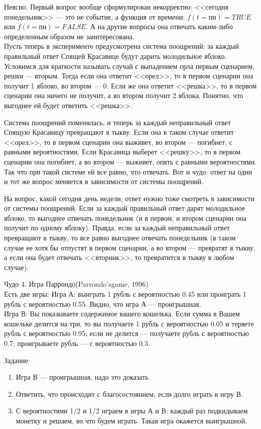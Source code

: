 Неясно. Первый вопрос вообще сформулирован некорректно: <<сегодня понедельник>> --- это не событие, а функция от времени: $f(t=пн)=TRUE$ или $f(t=пн)=FALSE$.
А на другие вопросы она отвечать каким-либо определенным образом не заинтересована. \\

Пусть теперь в эксперименте предусмотрена система поощрений: за каждый правильный ответ Спящей Красавице будут дарить молодильное яблоко. 
Условимся для краткости называть случай с выпадением орла первым сценарием, решки --- вторым.
Тогда если она ответит <<орел>>, то в первом сценарии она получит 1 яблоко, во втором --- 0.
Если же она ответит <<решка>>, то в первом сценарии она ничего не получит, а во втором получит 2 яблока.
Понятно, что выгоднее ей будет ответить <<решка>>.

Система поощрений поменялась, и теперь за каждый неправильный ответ Спящую Красавицу превращают в тыкву.
Если она в таком случае ответит <<орел>>, то в первом сценарии она выживет, во втором --- погибнет, с равными вероятностями. Если Красавица выберет <<решку>>, то в первом сценарии она  погибнет, а во втором --- выживет, опять с равными вероятностями. Так что при такой системе ей все равно, что отвечать.
Вот и чудо: ответ на один и тот же вопрос меняется в зависимости от системы поощрений.

На вопрос, какой сегодня день недели, ответ нужно тоже смотреть в зависимости от системы поощрений. Если за каждый правильный ответ дарят молодильное яблоко, то выгоднее отвечать понедельник (и в первом, и втором сценарии она получит по одному яблоку). Правда, если за каждый неправильный ответ превращают в тыкву, то все равно выгоднее отвечать понедельник (в таком случае ее хотя бы отпустят в первом сценарии, а во втором --- превратят в тыкву, а если она будет отвечать <<вторник>>, то превратится в тыкву в любом случае).

Чудо 4. Игра Паррондо(Parrondo'sgame, 1996)\\
Есть две игры:
Игра А: выиграть 1 рубль с вероятностью 0.45 или проиграть 1 рубль с вероятностью 0.55. Видно, что игра А --- проигрышная.\\
Игра В: Вы показываете содержимое вашего кошелька. Если сумма в Вашем кошельке делится на три, то вы получаете 1 рубль с вероятностью 0.05 и теряете рубль с вероятностью 0.95; если не делится --- получаете рубль с вероятностью 0.7; проигрываете рубль --- с вероятностью 0.3.

Задание:
\begin{enumerate}
\item Игра В --- проигрышная, надо это доказать.
\item Ответить, что происходит с благосостоянием, если долго играть в игру В.
\item С вероятностями 1/2 и 1/2 играем в игры А и В: каждый раз подкидываем монетку и решаем, во что будем играть. Такая игра окажется выигрышной.
\end{enumerate}

